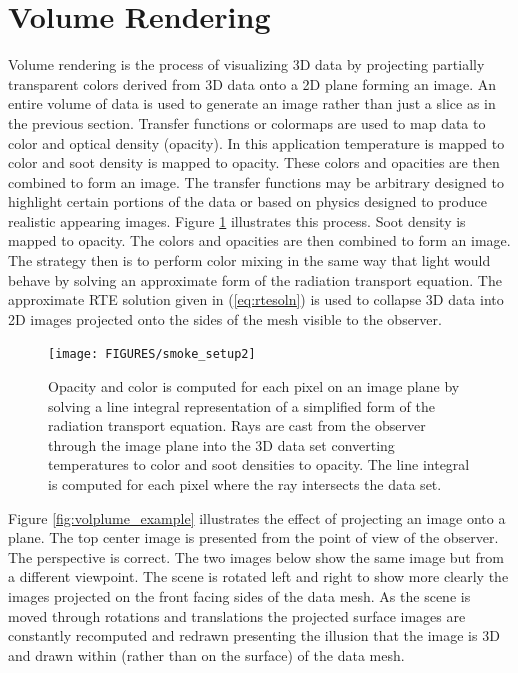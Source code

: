 {\section{Volume Rendering}
Volume rendering is the process of visualizing 3D data by projecting partially transparent colors derived from 3D data onto a 2D plane forming an image.  An entire volume of data is used to generate an image rather than just a slice as in the previous section.  Transfer functions or colormaps are used to map data to color and optical density (opacity).  In this application temperature is mapped to color and soot density is mapped to opacity.  These colors and opacities are then combined to form an image.  The transfer functions may be arbitrary designed to highlight certain portions of the data or based on physics designed to produce realistic appearing images.  Figure \ref{figsmokesetup2} illustrates this process.  
Soot density is mapped to opacity.  The colors and opacities are then combined to form an image.  The strategy then is to perform color mixing in the same way that light would behave by solving an approximate form of the radiation transport equation.  The approximate RTE solution given in (\ref{eq:rtesoln})  is used to collapse 3D data into 2D images projected onto the sides of the mesh visible to the observer.

\begin{figure}[\figoptions]
\begin{center}
\texttt{[image: FIGURES/smoke\_setup2]}
\end{center}
\caption[Opacity and color is computed for each pixel on an image plane by solving a line integral
representation of a simplified form of the radiation transport equation.]{Opacity and color is computed for each pixel on an image plane by solving a line integral
representation of a simplified form of the radiation transport equation.  Rays are cast from the observer through the  image plane into the 3D data set converting temperatures to color and soot densities to opacity.  The line integral is computed for each pixel where the ray intersects the data set.
}
\label{figsmokesetup2}
\end{figure}

Figure \ref{fig:volplume_example} illustrates the effect of projecting an image onto a plane.  The top center image is presented from the point of view of the observer.  The perspective is correct.  The two images below show the same image but from a different viewpoint.  The scene is rotated left and right to show more clearly the images projected on the front facing sides of the data mesh.  As the scene is moved through rotations and translations the projected surface images are constantly recomputed and redrawn presenting the illusion that the image is 3D and drawn within (rather than on the surface) of the data mesh.


}
